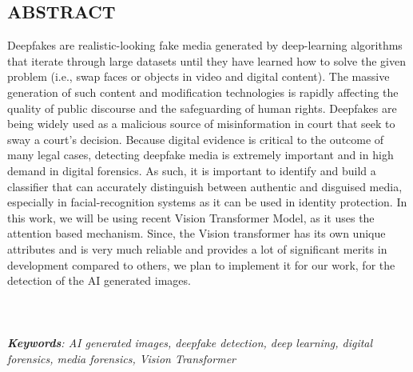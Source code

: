 \begin{center}


    \section*{ABSTRACT}
    \justify
    Deepfakes are realistic-looking fake media generated by deep-learning algorithms that iterate through large datasets until
    they have learned how to solve the given problem (i.e., swap faces or objects in video and digital content). The massive generation
    of such content and modification technologies is rapidly affecting the quality of public discourse and the safeguarding of
    human rights. Deepfakes are being widely used as a malicious source of misinformation in court that seek to sway a court’s decision.
    Because digital evidence is critical to the outcome of many legal cases, detecting deepfake media is extremely important and in high demand in digital forensics.
    As such, it is important to identify and build a classifier that can accurately distinguish between authentic and disguised media, especially in facial-recognition systems
    as it can be used in identity protection. In this work,
    we will be using recent Vision Transformer Model, as it uses the attention based mechanism. Since, the Vision transformer has its own unique attributes and is very much reliable and provides a lot of significant merits in development compared to others, we plan to implement it for our work, for the detection of the AI generated images.\\
    \\
    \\
    \\ \textit{\textbf{Keywords}: AI generated images, deepfake detection, deep learning, digital forensics, media forensics, Vision Transformer }


\end{center}
